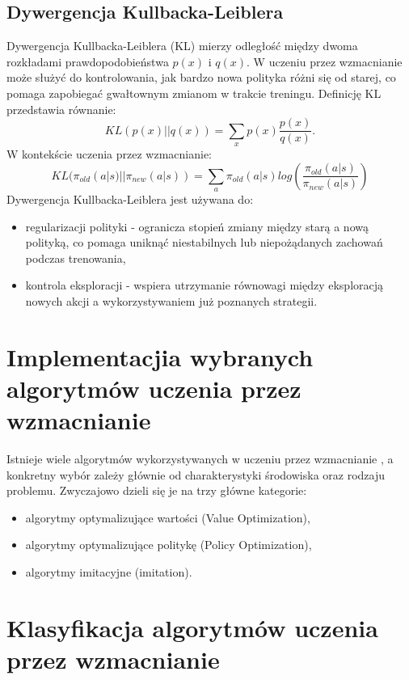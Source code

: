 \documentclass[a4paper, 12pt]{article}
\numberwithin{equation}{section}
\begin{document}
    \subsection{Dywergencja Kullbacka-Leiblera}
    Dywergencja Kullbacka-Leiblera (KL) mierzy odległość między dwoma rozkładami prawdopodobieństwa \( p(x) \) i \( q(x) \). W uczeniu przez wzmacnianie może służyć do kontrolowania, jak bardzo nowa polityka różni się od starej, co pomaga zapobiegać gwałtownym zmianom w trakcie treningu. Definicję KL przedstawia równanie:
    \begin{equation}
    KL(p(x) || q(x)) = \sum_{x} p(x) \frac{p(x)}{q(x)}.
    \end{equation}
    W kontekście uczenia przez wzmacnianie:
    \begin{equation}
    KL(\pi_{old}(a|s) || \pi_{new}(a|s)) = \sum_{a} \pi_{old}(a|s) log(\frac{\pi_{old}(a|s)}{\pi_{new}(a|s)})
    \end{equation}
    Dywergencja Kullbacka-Leiblera jest używana do:
    \begin{itemize}
        \item regularizacji polityki - ogranicza stopień zmiany między starą a nową polityką, co pomaga uniknąć niestabilnych lub niepożądanych zachowań podczas trenowania,
        \item kontrola eksploracji - wspiera utrzymanie równowagi między eksploracją nowych akcji a wykorzystywaniem już poznanych strategii.
    \end{itemize}
    \section{Implementacjia wybranych algorytmów uczenia przez wzmacnianie}
    Istnieje wiele algorytmów wykorzystywanych w uczeniu przez wzmacnianie \cite{sutton2018rl}, a konkretny wybór zależy głównie od charakterystyki środowiska oraz rodzaju problemu. Zwyczajowo dzieli się je na trzy główne kategorie:
    \begin{itemize}
        \item algorytmy optymalizujące wartości (Value Optimization),
        \item algorytmy optymalizujące politykę (Policy Optimization),
        \item algorytmy imitacyjne (imitation).
    \end{itemize}
    \section{Klasyfikacja algorytmów uczenia przez wzmacnianie}
\end{document}
